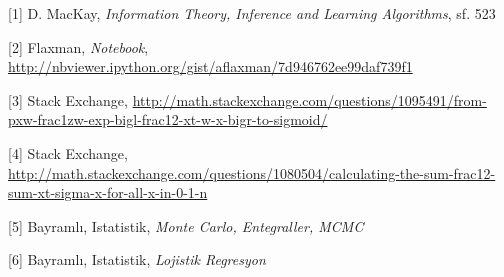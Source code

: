 \documentclass[12pt,fleqn]{article}\usepackage{../../common}
\begin{document}
[1] D. MacKay, {\em Information Theory, Inference and Learning Algorithms}, sf. 523

[2] Flaxman, {\em Notebook}, \url{http://nbviewer.ipython.org/gist/aflaxman/7d946762ee99daf739f1}

[3] Stack Exchange, 
    \url{http://math.stackexchange.com/questions/1095491/from-pxw-frac1zw-exp-bigl-frac12-xt-w-x-bigr-to-sigmoid/}

[4] Stack Exchange, 
     \url{http://math.stackexchange.com/questions/1080504/calculating-the-sum-frac12-sum-xt-sigma-x-for-all-x-in-0-1-n}

[5] Bayramlı, Istatistik, {\em Monte Carlo, Entegraller, MCMC}

[6] Bayramlı, Istatistik, {\em Lojistik Regresyon}
\end{document}
